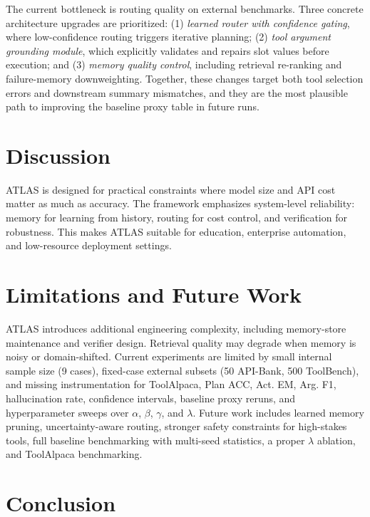 \documentclass[conference]{IEEEtran}
\begin{document}
The current bottleneck is routing quality on external benchmarks. Three concrete architecture upgrades are prioritized: (1) \textit{learned router with confidence gating}, where low-confidence routing triggers iterative planning; (2) \textit{tool argument grounding module}, which explicitly validates and repairs slot values before execution; and (3) \textit{memory quality control}, including retrieval re-ranking and failure-memory downweighting. Together, these changes target both tool selection errors and downstream summary mismatches, and they are the most plausible path to improving the baseline proxy table in future runs.

\section{Discussion}

ATLAS is designed for practical constraints where model size and API cost matter as much as accuracy. The framework emphasizes system-level reliability: memory for learning from history, routing for cost control, and verification for robustness. This makes ATLAS suitable for education, enterprise automation, and low-resource deployment settings.

\section{Limitations and Future Work}

ATLAS introduces additional engineering complexity, including memory-store maintenance and verifier design. Retrieval quality may degrade when memory is noisy or domain-shifted. Current experiments are limited by small internal sample size (9 cases), fixed-case external subsets (50 API-Bank, 500 ToolBench), and missing instrumentation for ToolAlpaca, Plan ACC, Act. EM, Arg. F1, hallucination rate, confidence intervals, baseline proxy reruns, and hyperparameter sweeps over $\alpha$, $\beta$, $\gamma$, and $\lambda$. Future work includes learned memory pruning, uncertainty-aware routing, stronger safety constraints for high-stakes tools, full baseline benchmarking with multi-seed statistics, a proper $\lambda$ ablation, and ToolAlpaca benchmarking.

\section{Conclusion}
\end{document}

